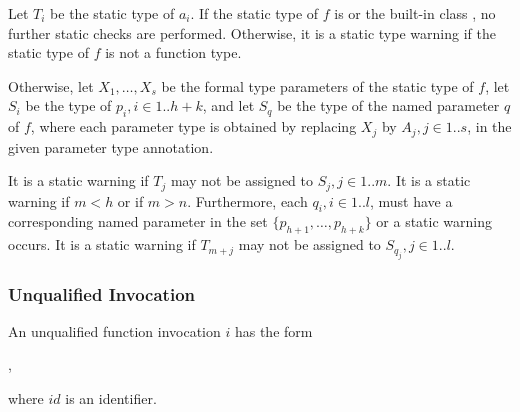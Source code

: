 \documentclass{article}
\begin{document}
\LMHash{}
Let $T_i$ be the static type of $a_i$.
If the static type of $f$ is \DYNAMIC{} or the built-in class \FUNCTION{},
no further static checks are performed.
Otherwise, it is a static type warning if the static type of $f$ is not a function type.

\LMHash{}
Otherwise, let $X_1, \ldots, X_s$ be the formal type parameters of the static type of $f$,
let $S_i$ be the type of $p_i, i \in 1 .. h+k$,
and let $S_q$ be the type of the named parameter $q$ of $f$,
where each parameter type is obtained by replacing $X_j$ by $A_j, j \in 1 .. s$, in the given parameter type annotation.


\LMHash{}
It is a static warning if $T_j$ may not be assigned to $S_j, j \in 1 .. m$.
It is a static warning if $m < h$ or if $m > n$.
Furthermore, each $q_i, i \in 1 .. l$, must have a corresponding named parameter in the set $\{p_{h+1}, \ldots, p_{h+k}\}$ or a static warning occurs.
It is a static warning if $T_{m+j}$ may not be assigned to $S_{q_j}, j \in 1 .. l$.


\subsubsection{Unqualified Invocation}

\LMHash{}
An unqualified function invocation $i$ has the form

,

\noindent
where $id$ is an identifier.

\end{document}

